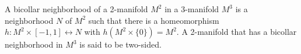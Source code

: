 A bicollar neighborhood of a 2-manifold $M^2$ in a 3-manifold $M^3$ is a neighborhood $N$ of $M^2$ such that there is a homeomorphism $h: M^2 \times [-1, 1] \leftrightarrow N$ with $h(M^2 \times \{0\}) = M^2$. A 2-manifold that has a bicollar neighborhood in $M^3$ is said to be two-sided.

